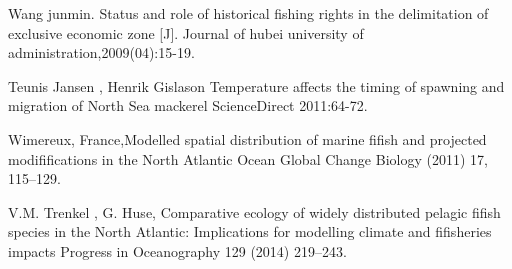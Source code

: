 \documentclass{mcmthesis}
\begin{document}

\begin{thebibliography}{9}%
	
	 Wang junmin. Status and role of historical fishing rights in the delimitation of exclusive economic zone [J]. Journal of hubei university of administration,2009(04):15-19.
	
	 Teunis Jansen , Henrik Gislason Temperature affects the timing of spawning and migration of North Sea mackerel ScienceDirect 2011:64-72.
	
	 Wimereux, France,Modelled spatial distribution of marine fifish and projected modififications in the North Atlantic Ocean Global Change Biology (2011) 17, 115–129.
	
	 V.M. Trenkel  , G. Huse,   Comparative ecology of widely distributed pelagic fifish species in the North Atlantic: Implications for modelling climate and fifisheries impacts Progress in Oceanography 129 (2014) 219–243.
	
\end{thebibliography}
\begin{comment}
\begin{thebibliography}{99}
\bibitem{1} D.~E. KNUTH   The \TeX{}book  the American
Mathematical Society and Addison-Wesley
Publishing Company , 1984-1986.
\bibitem{2}Lamport, Leslie,  \LaTeX{}: `` A Document Preparation System '',
Addison-Wesley Publishing Company, 1986.
\bibitem{3}\url{http://www.latexstudio.net/}
\bibitem{4}\url{http://www.chinatex.org/}
\end{thebibliography}
\end{comment}
\end{document}
